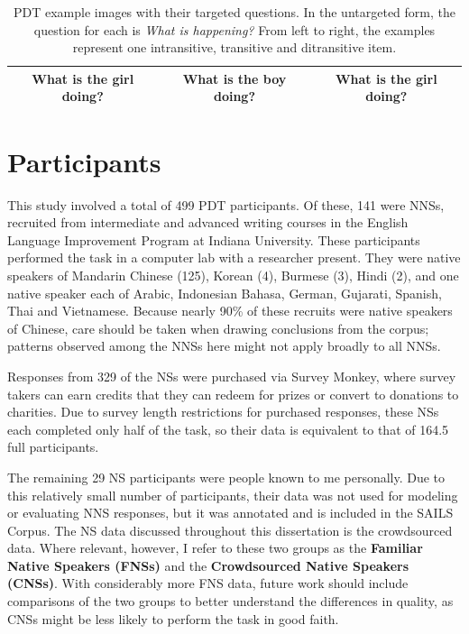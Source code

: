 \begin{table}[htb!]
\begin{center}
\begin{tabular}{|c|c|c|}
\hline
What is the girl doing? & What is the boy doing? & What is the girl doing? \\
\hline
\end{tabular}
\caption{\label{tab:example-pdt-items} PDT example images with their targeted questions. In the untargeted form, the question for each is \textit{What is happening?} From left to right, the examples represent one intransitive, transitive and ditransitive item.}
\end{center}
\end{table}


\section{Participants}
\label{sec:participants}

This study involved a total of 499 PDT participants. Of these, 141 were NNSs, recruited from intermediate and advanced writing courses in the English Language Improvement Program at Indiana University. These participants performed the task in a computer lab with a researcher present. They were native speakers of Mandarin Chinese (125), Korean (4), Burmese (3), Hindi (2), and one native speaker each of Arabic, Indonesian Bahasa, German, Gujarati, Spanish, Thai and Vietnamese. Because nearly 90\% of these recruits were native speakers of Chinese, care should be taken when drawing conclusions from the corpus; patterns observed among the NNSs here might not apply broadly to all NNSs.

Responses from 329 of the NSs were purchased via Survey Monkey, where survey takers can earn credits that they can redeem for prizes or convert to donations to charities. Due to survey length restrictions for purchased responses, these NSs each completed only half of the task, so their data is equivalent to that of 164.5 full participants.

The remaining 29 NS participants were people known to me personally. Due to this relatively small number of participants, their data was not used for modeling or evaluating NNS responses, but it was annotated and is included in the SAILS Corpus. The NS data discussed throughout this dissertation is the crowdsourced data. Where relevant, however, I refer to these two groups as the \textbf{Familiar Native Speakers (FNSs)} and the \textbf{Crowdsourced Native Speakers (CNSs)}. With considerably more FNS data, future work should include comparisons of the two groups to better understand the differences in quality, as CNSs might be less likely to perform the task in good faith.

